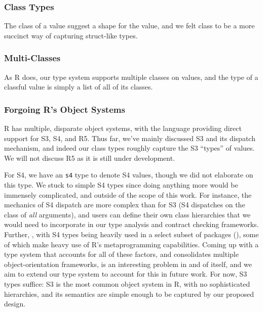 \documentclass[acmsmall,review,anonymous]{acmart}\settopmatter{printfolios=true,printccs=false,printacmref=false}
\newcommand{\code}[1]{{\lstinline[style=Rin]!#1!}\xspace}
\begin{document}
%
%
\subsubsection{Class Types}

The class of a value suggest a shape for the value, and we felt class to be a more succinct way of capturing struct-like types. 


%
%
\subsubsection{Multi-Classes}

As R does, our type system supports multiple classes on values, and the type of a classful value is simply a list of all of its classes. 


%
%
\subsubsection{Forgoing R's Object Systems}

R has multiple, disparate object systems, with the language providing direct support for S3, S4, and R5.
Thus far, we've mainly discussed S3 and its dispatch mechanism, and indeed our class types roughly capture the S3 ``types'' of values.
We will not discuss R5 as it is still under development.

For S4, we have an \code{s4} type to denote S4 values, though we did not elaborate on this type.
We stuck to simple S4 types since doing anything more would be immensely complicated, and outside of the scope of this work.
For instance, the mechanics of S4 dispatch are more complex than for S3 (S4 dispatches on the class of {\it all} arguments), and users can define their own class hierarchies that we would need to incorporate in our type analysis and contract checking frameworks.
Further, , with S4 types being heavily used in a select subset of packages (), some of which make heavy use of R's metaprogramming capabilities.
Coming up with a type system that accounts for all of these factors, and consolidates multiple object-orientation frameworks, is an interesting problem in and of itself, and we aim to extend our type system to account for this in future work.
For now, S3 types suffice: S3 is the most common object system in R, with no sophisticated hierarchies, and its semantics are simple enough to be captured by our proposed design.
\end{document}
